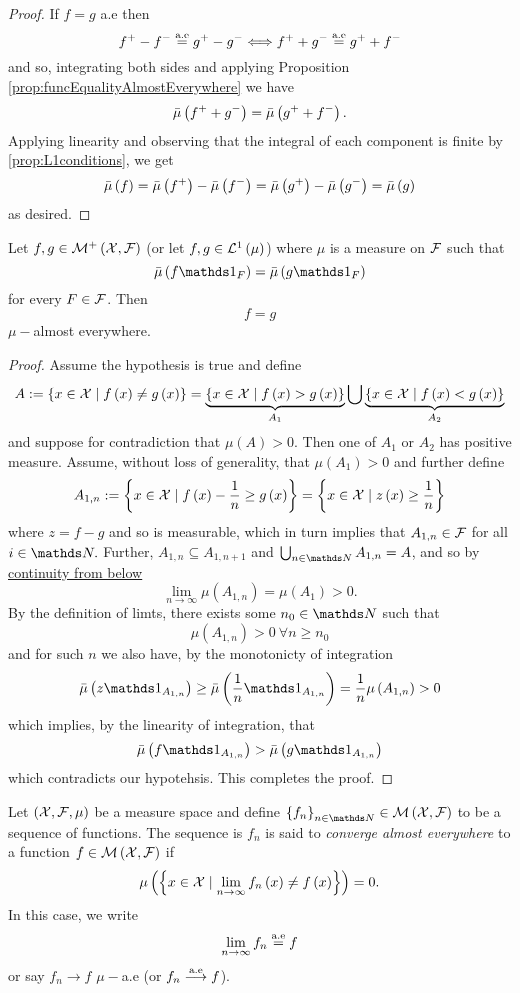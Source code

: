 \begin{proof}
If $f=g$ a.e then
\[
f^{+}-f^{-}\stackrel{\textnormal{a.e}}{=}g^{+}-g^{-}\Longleftrightarrow f^{+}+g^{-}\stackrel{\textnormal{a.e}}{=}g^{+}+f^{-}
\]
and so, integrating both sides and applying Proposition \ref{prop:funcEqualityAlmostEverywhere}
we have
\[
\bar{\mu}\left(f^{+}+g^{-}\right)=\bar{\mu}\left(g^{+}+f^{-}\right).
\]
Applying linearity and observing that the integral of each component
is finite by \ref{prop:L1conditions}, we get 
\[
\bar{\mu}\left(f\right)=\bar{\mu}\left(f^{+}\right)-\bar{\mu}\left(f^{-}\right)=\bar{\mu}\left(g^{+}\right)-\bar{\mu}\left(g^{-}\right)=\bar{\mu}\left(g\right)
\]
as desired.
\end{proof}
\begin{prop}
\label{prop:intEqualFuncEqual} Let $f,g\in\mathcal{M}^{+}\left(\mathcal{X},\mathcal{F}\right)$ (or  let $f,g \in \mathcal{L}^{1}\left(\mu\right)$)
where $\mu$ is a measure on $\mathcal{F}$ such that 
\[
\lebInt{\mu}{f\indicate_{F}}=\lebInt{\mu}{g\indicate_{F}}
\]
for every $F\in\mathcal{F}$. Then
\[
f=g
\]
$\mu-$almost everywhere.
\end{prop}

\begin{proof}
Assume the hypothesis is true and define
\[
A:=\left\{ x\in\mathcal{X}\mid f\left(x\right)\neq g\left(x\right)\right\} =\underbrace{\left\{ x\in\mathcal{X}\mid f\left(x\right)>g\left(x\right)\right\} }_{A_{1}}\bigcup\underbrace{\left\{ x\in\mathcal{X}\mid f\left(x\right)<g\left(x\right)\right\} }_{A_{2}}
\]
and suppose for contradiction that $\mu\left(A\right)>0.$ Then one
of $A_{1}$ or $A_{2}$ has positive measure. Assume, without loss
of generality, that $\mu\left(A_{1}\right)>0$ and further define
\[
A_{1,n}:=\left\{ x\in\mathcal{X}\mid f\left(x\right)-\frac{1}{n}\geq g\left(x\right)\right\} =\left\{ x\in\mathcal{X}\mid z\left(x\right)\geq\frac{1}{n}\right\} 
\]
where $z=f-g$ and so is measurable, which in turn implies that $A_{1,n}\in\mathcal{F}$
for all $i\in\N.$ Further, $A_{1,n}\subseteq A_{1,n+1}$ and $\bigcup_{n\in\N}A_{1,n}=A$,
and so by \hyperref[prop:measureProperties]{continuity from below}
\[
\lim_{n\to\infty}\mu\left(A_{1,n}\right)=\mu\left(A_{1}\right)>0.
\]
By the definition of limts, there exists some $n_{0}\in\N$ such that
\[
\mu\left(A_{1,n}\right)>0\ \forall n\geq n_{0}
\]
and for such $n$ we also have, by the monotonicty of integration
\[
\lebInt{\mu}{z\indicate_{A_{1,n}}}\geq\lebInt{\mu}{\frac{1}{n}\indicate_{A_{1,n}}}=\frac{1}{n}\mu\left(A_{1,n}\right)>0
\]
which implies, by the linearity of integration, that
\[
\lebInt{\mu}{f\indicate_{A_{1,n}}}>\lebInt{\mu}{g\indicate_{A_{1,n}}}
\]
which contradicts our hypotehsis. This completes the proof.
\end{proof}
\begin{defn}
\label{def:convAlmostEverywhere}Let $\left(\mathcal{X},\mathcal{F},\mu\right)$ be
a measure space and define $\left\{ f_{n}\right\} _{n\in\N}\in\measurableFunctions$
to be a sequence of functions. The sequence is $f_{n}$ is said to
\emph{converge almost everywhere} to a function $f\in\mathcal{M}\left(\mathcal{X},\mathcal{F}\right)$
if 
\[
\mu\left(\left\{ x\in\mathcal{X}\mid\lim_{n\to\infty}f_{n}\left(x\right)\neq f\left(x\right)\right\} \right)=0.
\]
In this case, we write
\[
\lim_{n\to\infty}f_{n}\stackrel{\textnormal{a.e}}{=}f
\]
or say $f_{n}\longrightarrow f$ $\mu-$a.e (or $f_{n}\stackrel{\textnormal{a.e}}{\longrightarrow}f$).
\end{defn}

